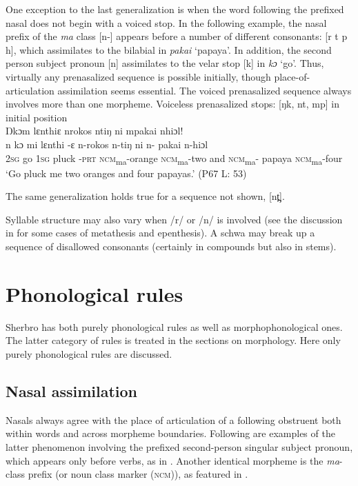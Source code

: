 One exception to the last generalization is when the word following the prefixed nasal does not begin with a voiced stop. In the following example, the nasal prefix of the \textit{ma} class [n-] appears before a number of different consonants: [r t p h], which assimilates to the bilabial in \textit{pakai} ‘papaya'. In addition, the second person subject pronoun [n] assimilates to the velar stop [k] in \textit{kɔ} ‘go'. Thus, virtually any prenasalized sequence is possible initially, though place-of-articulation assimilation seems essential. The voiced prenasalized sequence always involves more than one morpheme.
\clearpage
\ea%
\label{ex:34}
Voiceless prenasalized stops: [ŋk, nt, mp] in initial position\\
\vspace{6pt}
Ŋkɔm lɛnthiɛ nrokos ntiŋ ni mpakai nhiɔl!\\
\gll n    kɔ    mi    lɛnthi  {}-ɛ    n-rokos        n-tiŋ      ni    n-      pakai    n-hiɔl\\
\textsc{2sg}  go    \textsc{1sg}  pluck  {}-\textsc{prt}  \textsc{ncm}\textsubscript{ma}{}-orange    \textsc{ncm}\textsubscript{ma}{}-two and  \textsc{ncm}\textsubscript{ma}{}-  papaya  \textsc{ncm}\textsubscript{ma}{}-four\\
\glt ‘Go pluck me two oranges and four papayas.' (P67 L: 53)
\z

The same generalization holds true for a sequence not shown, [nt̪].

Syllable structure may also vary when /r/ or /n/ is involved (see the discussion in  for some cases of metathesis and epenthesis). A schwa may break up a sequence of disallowed consonants (certainly in compounds but also in stems).

\section{Phonological rules}
\label{sec:2.4}\hypertarget{Toc115517758}{}
Sherbro has both purely phonological rules as well as morphophonological ones. The latter category of rules is treated in the sections on morphology. Here only purely phonological rules are discussed.

\subsection{Nasal assimilation}
\label{sec:2.4.1}
Nasals always agree with the place of articulation of a following obstruent both within words and across morpheme boundaries. Following are examples of the latter phenomenon involving the prefixed second-person singular subject pronoun, which appears only before verbs, as in . Another identical morpheme is the \textit{ma}{}-class prefix (or noun class marker (\textsc{ncm})), as featured in .

